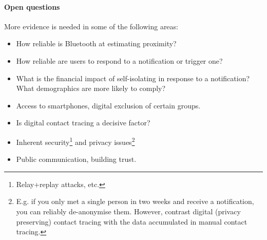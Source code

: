 \paragraph{Open questions}
More evidence is needed in some of the following areas:
\begin{itemize}
	\item How reliable is Bluetooth at estimating proximity?
	\item How reliable are users to respond to a notification or trigger one?
	\item What is the financial impact of self-isolating in response to a notification?
	What demographics are more likely to comply?
	\item Access to smartphones, digital exclusion of certain groups.
	\item Is digital contact tracing a decisive factor?
	\item Inherent security\footnote{Relay+replay attacks, etc.} and privacy issues\footnote{E.g. if you only met a single person in two weeks and receive a notification, you can reliably de-anonymise them.
	However, contrast digital (privacy preserving) contact tracing with the data accumulated in manual contact tracing.}
	\item Public communication, building trust.
\end{itemize}

